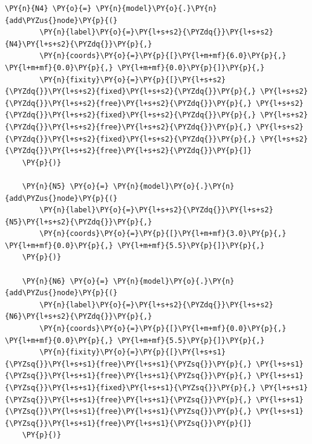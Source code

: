 \begin{tcolorbox}[breakable, size=fbox, boxrule=1pt, pad at break*=1mm,colback=cellbackground, colframe=cellborder]
\begin{Verbatim}[commandchars=\\\{\}]
    \PY{n}{N4} \PY{o}{=} \PY{n}{model}\PY{o}{.}\PY{n}{add\PYZus{}node}\PY{p}{(}
        \PY{n}{label}\PY{o}{=}\PY{l+s+s2}{\PYZdq{}}\PY{l+s+s2}{N4}\PY{l+s+s2}{\PYZdq{}}\PY{p}{,}
        \PY{n}{coords}\PY{o}{=}\PY{p}{[}\PY{l+m+mf}{6.0}\PY{p}{,} \PY{l+m+mf}{0.0}\PY{p}{,} \PY{l+m+mf}{0.0}\PY{p}{]}\PY{p}{,}
        \PY{n}{fixity}\PY{o}{=}\PY{p}{[}\PY{l+s+s2}{\PYZdq{}}\PY{l+s+s2}{fixed}\PY{l+s+s2}{\PYZdq{}}\PY{p}{,} \PY{l+s+s2}{\PYZdq{}}\PY{l+s+s2}{free}\PY{l+s+s2}{\PYZdq{}}\PY{p}{,} \PY{l+s+s2}{\PYZdq{}}\PY{l+s+s2}{fixed}\PY{l+s+s2}{\PYZdq{}}\PY{p}{,} \PY{l+s+s2}{\PYZdq{}}\PY{l+s+s2}{free}\PY{l+s+s2}{\PYZdq{}}\PY{p}{,} \PY{l+s+s2}{\PYZdq{}}\PY{l+s+s2}{fixed}\PY{l+s+s2}{\PYZdq{}}\PY{p}{,} \PY{l+s+s2}{\PYZdq{}}\PY{l+s+s2}{free}\PY{l+s+s2}{\PYZdq{}}\PY{p}{]}
    \PY{p}{)}
    
    \PY{n}{N5} \PY{o}{=} \PY{n}{model}\PY{o}{.}\PY{n}{add\PYZus{}node}\PY{p}{(}
        \PY{n}{label}\PY{o}{=}\PY{l+s+s2}{\PYZdq{}}\PY{l+s+s2}{N5}\PY{l+s+s2}{\PYZdq{}}\PY{p}{,}
        \PY{n}{coords}\PY{o}{=}\PY{p}{[}\PY{l+m+mf}{3.0}\PY{p}{,} \PY{l+m+mf}{0.0}\PY{p}{,} \PY{l+m+mf}{5.5}\PY{p}{]}\PY{p}{,}
    \PY{p}{)}
    
    \PY{n}{N6} \PY{o}{=} \PY{n}{model}\PY{o}{.}\PY{n}{add\PYZus{}node}\PY{p}{(}
        \PY{n}{label}\PY{o}{=}\PY{l+s+s2}{\PYZdq{}}\PY{l+s+s2}{N6}\PY{l+s+s2}{\PYZdq{}}\PY{p}{,}
        \PY{n}{coords}\PY{o}{=}\PY{p}{[}\PY{l+m+mf}{0.0}\PY{p}{,} \PY{l+m+mf}{0.0}\PY{p}{,} \PY{l+m+mf}{5.5}\PY{p}{]}\PY{p}{,}
        \PY{n}{fixity}\PY{o}{=}\PY{p}{[}\PY{l+s+s1}{\PYZsq{}}\PY{l+s+s1}{free}\PY{l+s+s1}{\PYZsq{}}\PY{p}{,} \PY{l+s+s1}{\PYZsq{}}\PY{l+s+s1}{free}\PY{l+s+s1}{\PYZsq{}}\PY{p}{,} \PY{l+s+s1}{\PYZsq{}}\PY{l+s+s1}{fixed}\PY{l+s+s1}{\PYZsq{}}\PY{p}{,} \PY{l+s+s1}{\PYZsq{}}\PY{l+s+s1}{free}\PY{l+s+s1}{\PYZsq{}}\PY{p}{,} \PY{l+s+s1}{\PYZsq{}}\PY{l+s+s1}{free}\PY{l+s+s1}{\PYZsq{}}\PY{p}{,} \PY{l+s+s1}{\PYZsq{}}\PY{l+s+s1}{free}\PY{l+s+s1}{\PYZsq{}}\PY{p}{]}
    \PY{p}{)}
    \end{Verbatim}
\end{tcolorbox}

